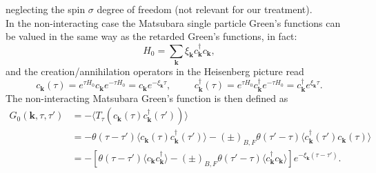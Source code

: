 \documentclass[12pt, a4paper]{report}
\numberwithin{equation}{section}
\begin{document}
neglecting the spin $\sigma$ degree of freedom (not relevant for our treatment).\\
In the non-interacting case the Matsubara single particle Green's functions can be valued in the same way as the retarded Green's functions, 
in fact:
\begin{equation}
    H_0=\sum_{\mathbf{k}}\xi_\mathbf{k}c^\dagger_\mathbf{k}c_\mathbf{k},
\end{equation}
and the creation/annihilation operators in the Heisenberg picture read
\begin{equation}
    c_\mathbf{k}(\tau)=e^{\tau H_0}c_\mathbf{k}e^{-\tau H_0}=c_\mathbf{k}e^{-\xi_\mathbf{k}\tau},\hspace{1cm}c^\dagger_\mathbf{k}(\tau)=e^{\tau H_0}c^\dagger_\mathbf{k}e^{-\tau H_0}=c^\dagger_\mathbf{k}e^{\xi_\mathbf{k}\tau}.
\end{equation}
The non-interacting Matsubara Green's function is then defined as 
\begin{equation}
\begin{split}
    G_0(\mathbf{k},\tau,\tau')&=-\langle T_\tau\left(c_\mathbf{k}(\tau)c^\dagger_\mathbf{k}(\tau')\right)\rangle\\
    &=-\theta(\tau-\tau')\langle c_\mathbf{k}(\tau)c^\dagger_\mathbf{k}(\tau')\rangle-(\pm)_{B,F}\theta(\tau'-\tau)\langle c^\dagger_\mathbf{k}(\tau')c_\mathbf{k}(\tau)\rangle\\
    &=-\left[\theta(\tau-\tau')\langle c_\mathbf{k}c^\dagger_\mathbf{k}\rangle-(\pm)_{B,F}\theta(\tau'-\tau)\langle c_\mathbf{k}^\dagger c_\mathbf{k}\rangle\right]e^{-\xi_\mathbf{k}(\tau-\tau')}.
    \label{free_propagator}
\end{split}
\end{equation}
\end{document}
